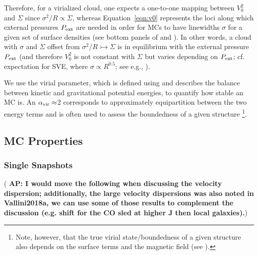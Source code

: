 \IfFileExists{emulateapjlegacy.cls}{\documentclass[iop]{emulateapjlegacy}}{\documentclass[iop]{emulateapj}}
\newcommand{\AP}[1]{({\bf \color{apcolor} AP: #1})}
\begin{document}
Therefore, for a virialized cloud, one expects a one-to-one mapping between $V_0^2$ and $\Sigma$ since
$\sigma^2/R\propto\Sigma$, whereas
Equation~\ref{eqn:v0} represents the loci along which external pressures $P_{\rm ext}$ are
needed in order for MCs to have linewidths $\sigma$ for a given set of surface densities (see bottom panels of  and 
).
In other words, a cloud with $\sigma$ and $\Sigma$ offset from $\sigma^2/R\rightarrowtail\Sigma$
is in equilibrium with the external pressure $P_{\rm ext}$ (and therefore $V_0^2$ is not constant with $\Sigma$ but
varies depending on $P_{\rm ext}$; cf. expectation for SVE, where
$\sigma\propto R^{0.5}$; see e.g., \citealt{Heyer09a, Hughes10a, Hughes13b, Meidt13a}).

We use the virial parameter, which is defined using  and describes 
the balance between kinetic and gravitational potential energies, 
to quantify how stable an MC is. 
An $\alpha_{\rm vir}\approx$2 corresponds to approximately equipartition between the two energy terms 
and is often used to assess the boundedness of a given structure \citep[see e.g., ][]{Kauffmann17b}\footnote{Note, however, that 
the true virial state/boundedness of a given structure also depends on the surface terms and the magnetic field (see ).}.

\subsection{MC Properties}
\subsubsection{Single Snapshots}  \label{sec:singless}

%
\AP{I would move the following when discussing the velocity dispersion; additionally, the large velocity dispersions was also noted in Vallini2018a, we can use some of those results to complement the discussion (e.g. shift for the CO sled at higher J then local galaxies).}
\end{document}
